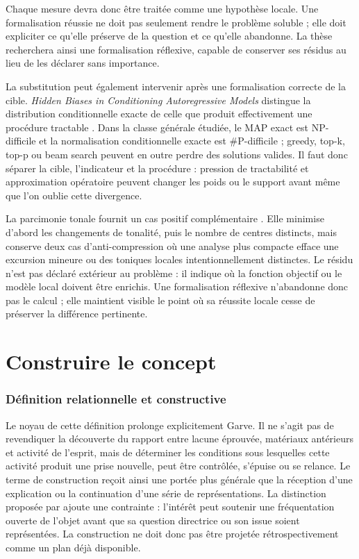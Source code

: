 \documentclass[11pt,a4paper]{article}
\begin{document}
Chaque mesure devra donc être traitée comme une hypothèse locale. Une
formalisation réussie ne doit pas seulement rendre le problème soluble ; elle
doit expliciter ce qu'elle préserve de la question et ce qu'elle abandonne. La
thèse recherchera ainsi une formalisation réflexive, capable de conserver ses
résidus au lieu de les déclarer sans importance.

La substitution peut également intervenir après une formalisation correcte de
la cible. \emph{Hidden Biases in Conditioning Autoregressive Models} distingue
la distribution conditionnelle exacte de celle que produit effectivement une
procédure tractable \parencite{pachet2026biases}. Dans la classe générale
étudiée, le MAP exact est NP-difficile et la normalisation conditionnelle exacte
est \#P-difficile ; greedy, top-k, top-p ou beam search peuvent en outre perdre
des solutions valides. Il faut donc séparer la cible, l'indicateur et la
procédure : pression de tractabilité et approximation opératoire peuvent changer
les poids ou le support avant même que l'on oublie cette divergence.

La parcimonie tonale fournit un cas positif complémentaire
\parencite{pachet2026tonalparsimony}. Elle minimise d'abord les changements de
tonalité, puis le nombre de centres distincts, mais conserve deux cas
d'anti-compression où une analyse plus compacte efface une excursion mineure ou
des toniques locales intentionnellement distinctes. Le résidu n'est pas déclaré
extérieur au problème : il indique où la fonction objectif ou le modèle local
doivent être enrichis. Une formalisation réflexive n'abandonne donc pas le
calcul ; elle maintient visible le point où sa réussite locale cesse de préserver
la différence pertinente.

\part{Construire le concept}

\section{Définition relationnelle et constructive}

Le noyau de cette définition prolonge explicitement Garve. Il ne s'agit pas de
revendiquer la découverte du rapport entre lacune éprouvée, matériaux antérieurs
et activité de l'esprit, mais de déterminer les conditions sous lesquelles
cette activité produit une prise nouvelle, peut être contrôlée, s'épuise ou se
relance. Le terme de construction reçoit ainsi une portée plus générale que la
réception d'une explication ou la continuation d'une série de représentations.
La distinction proposée par \textcite{vazard2026inquiry} ajoute une contrainte :
l'intérêt peut soutenir une fréquentation ouverte de l'objet avant que sa
question directrice ou son issue soient représentées. La construction ne doit
donc pas être projetée rétrospectivement comme un plan déjà disponible.
\end{document}
